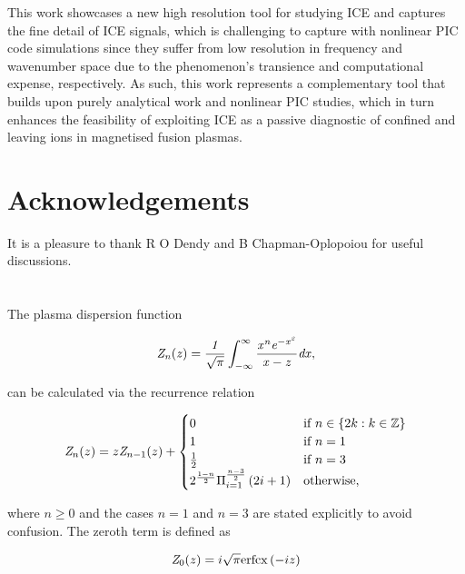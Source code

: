 \documentclass[12pt]{iopart}
\begin{document}
This work showcases a new high resolution tool for studying ICE and captures the
fine detail of ICE signals, which is challenging to capture with nonlinear PIC
code simulations since they suffer from low resolution in frequency and
wavenumber space due to the phenomenon's transience and computational expense,
respectively. As such, this work represents a complementary tool that builds
upon purely analytical work and nonlinear PIC studies, which in turn enhances
the feasibility of exploiting ICE as a passive diagnostic of confined and
leaving ions in magnetised fusion plasmas.

\section{Acknowledgements}

It is a pleasure to thank R O Dendy and B Chapman-Oplopoiou for useful discussions.

\appendix

\section{}

The plasma dispersion function\cite{Fried1961}

\begin{equation}
\it{Z}_n(z)=\frac{1}{\sqrt{\pi}}\int_{-\infty}^{\infty}\frac{x^n e^{-x^2}}{x-z}dx,
\end{equation}

\noindent can be calculated via the recurrence relation\cite{Sampoorna2007}

\begin{equation}
{\it Z}_n(z) = z {\it Z}_{n-1}(z) + \begin{cases}
0 & \text{if } n \in \{2k : k \in \mathbb{Z}\}
\\
1 & \text{if } n = 1
\\
\frac{1}{2} & \text{if } n = 3
\\
2^{\frac{1-n}{2}} \Pi_{i=1}^{\frac{n-3}{2}} \left( 2i + 1 \right) & \text{otherwise},
\end{cases}
\end{equation}

\noindent where $n \geq 0$ and the cases $n=1$ and $n=3$ are stated explicitly to avoid confusion. The zeroth term is defined as

\begin{equation}
 {\it Z}_0(z) = i \sqrt{\pi} \mathrm{erfcx} \left(-i z \right)
\end{equation}
\end{document}
